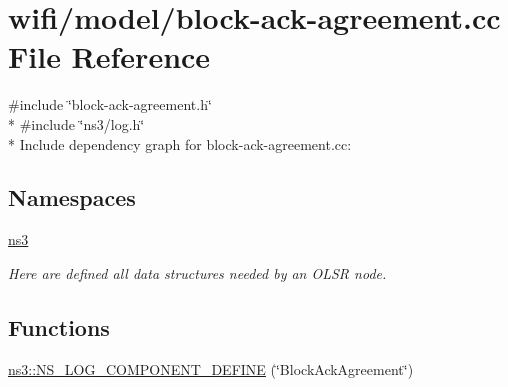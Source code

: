 \hypertarget{block-ack-agreement_8cc}{}\section{wifi/model/block-\/ack-\/agreement.cc File Reference}
\label{block-ack-agreement_8cc}
{\ttfamily \#include \char`\"{}block-\/ack-\/agreement.\+h\char`\"{}}\\*
{\ttfamily \#include \char`\"{}ns3/log.\+h\char`\"{}}\\*
Include dependency graph for block-\/ack-\/agreement.cc\+:
\subsection*{Namespaces}
\begin{DoxyCompactItemize}
\item 
 \hyperlink{namespacens3}{ns3}
\begin{DoxyCompactList}\small\item\em Here are defined all data structures needed by an O\+L\+SR node. \end{DoxyCompactList}\end{DoxyCompactItemize}
\subsection*{Functions}
\begin{DoxyCompactItemize}
\item 
\hyperlink{namespacens3_abe2de4efd9b788116c12fec040e83e2d}{ns3\+::\+N\+S\+\_\+\+L\+O\+G\+\_\+\+C\+O\+M\+P\+O\+N\+E\+N\+T\+\_\+\+D\+E\+F\+I\+NE} (\char`\"{}Block\+Ack\+Agreement\char`\"{})
\end{DoxyCompactItemize}
